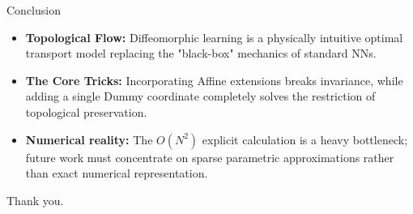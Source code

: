 \documentclass[aspectratio=169]{beamer}
\begin{document}
\begin{frame}{Conclusion}
\begin{itemize}
  \item \textbf{Topological Flow:} Diffeomorphic learning is a physically intuitive optimal transport model replacing the "black-box" mechanics of standard NNs.
  \item \textbf{The Core Tricks:} Incorporating Affine extensions breaks invariance, while adding a single Dummy coordinate completely solves the restriction of topological preservation.
  \item \textbf{Numerical reality:} The $O(N^2)$ explicit calculation is a heavy bottleneck; future work must concentrate on sparse parametric approximations rather than exact numerical representation.
\end{itemize}
\end{frame}

\begin{frame}
\centering
\Large Thank you.

\vspace{1cm}
\end{frame}
\end{document}
